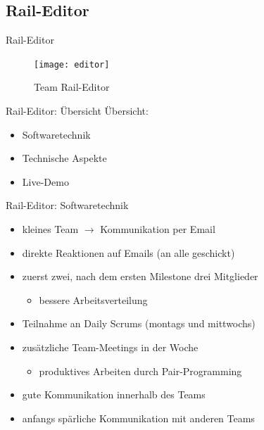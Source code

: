 \subsection{Rail-Editor}

\begin{frame}{Rail-Editor}

\begin{figure}
  \begin{center}
    \leavevmode
      \texttt{[image: editor]}
    \caption{Team Rail-Editor}
  \end{center}
\end{figure}

\end{frame}

\begin{frame}{Rail-Editor: Übersicht}
	\pause
	Übersicht:
	\begin{itemize}
		\pause
		\item Softwaretechnik
		\pause
		\item Technische Aspekte
		\pause
		\item Live-Demo
	\end{itemize}

\end{frame}

\pagebreak

\begin{frame}{Rail-Editor: Softwaretechnik}
	\pause
	\begin{itemize}
		\item kleines Team $\rightarrow$ Kommunikation per Email
		\pause
		\item direkte Reaktionen auf Emails (an alle geschickt)
		\pause
		\item zuerst zwei, nach dem ersten Milestone drei Mitglieder
		\begin{itemize}
			\item bessere Arbeitsverteilung
		\end{itemize}
		\pause
		\item Teilnahme an Daily Scrums (montags und mittwochs)
		\pause
		\item zusätzliche Team-Meetings in der Woche
		\begin{itemize}
			\item produktives Arbeiten durch Pair-Programming
		\end{itemize}
		\pause
		\item gute Kommunikation innerhalb des Teams
		\pause
		\item anfangs spärliche Kommunikation mit anderen Teams
	\end{itemize}
\end{frame}

